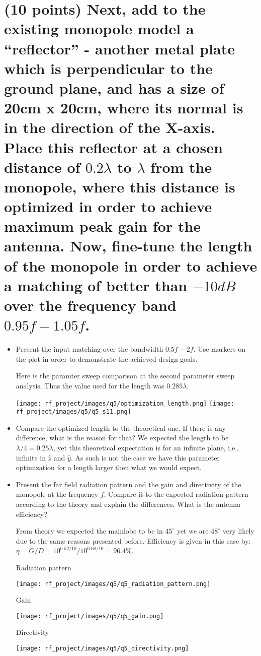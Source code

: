 \documentclass[12pt, letterpaper]{article}
\begin{document}
\section{(10 points) Next, add to the existing monopole model a “reflector” - another metal plate which is perpendicular to the ground plane, and has a size of 20cm x 20cm, where its normal is in the direction of the X-axis. Place this reflector at a chosen distance of $0.2\lambda$ to $\lambda$ from the monopole, where this distance is optimized in order to achieve maximum peak gain for the antenna. Now, fine-tune the length of the monopole in order to achieve a matching of better than $-10dB$ over the frequency band $0.95f -1.05f$.}

\begin{itemize}
  \item Present the input matching over the bandwidth $0.5f -2f$. Use markers on the plot in order to demonstrate the achieved design goals.
  \begin{center}
    {\color{blue}Here is the paramter sweep comparison at the second parameter sweep analysis. Thus the value used for the length was $0.285\lambda$.}
  \end{center}
  \texttt{[image: rf\_project/images/q5/optimization\_length.png]}
  \texttt{[image: rf\_project/images/q5/q5\_s11.png]}
  \item Compare the optimized length to the theoretical one. If there is any difference, what is the reason for that?
  {\color{blue}We expected the length to be $\lambda/4=0.25\lambda$, yet this theoretical expectation is for an infinite plane, i.e., infinite in $\hat{z}$ and $\hat{y}$. As such is not the case we have this parameter optimization for a length larger then what we would expect.}
  \item Present the far field radiation pattern and the gain and directivity of the monopole at the frequency $f$. Compare it to the expected radiation pattern according to the theory and explain the differences. What is the antenna efficiency?

  {\color{blue}From theory we expected the mainlobe to be in $45^{\circ}$ yet we are $48^{\circ}$ very likely due to the same reasons presented before. Efficiency is given in this case by: $\eta=G/D=10^{6.52/10}/10^{6.68/10}=96.4\%$.}
  \begin{center}
    Radiation pattern
  \end{center}
  \texttt{[image: rf\_project/images/q5/q5\_radiation\_pattern.png]}
  \pagebreak
  \begin{center}
    Gain
  \end{center}
  \texttt{[image: rf\_project/images/q5/q5\_gain.png]}
  \pagebreak
  \begin{center}
    Directivity
  \end{center}
  \texttt{[image: rf\_project/images/q5/q5\_directivity.png]}
\end{itemize}
\end{document}

